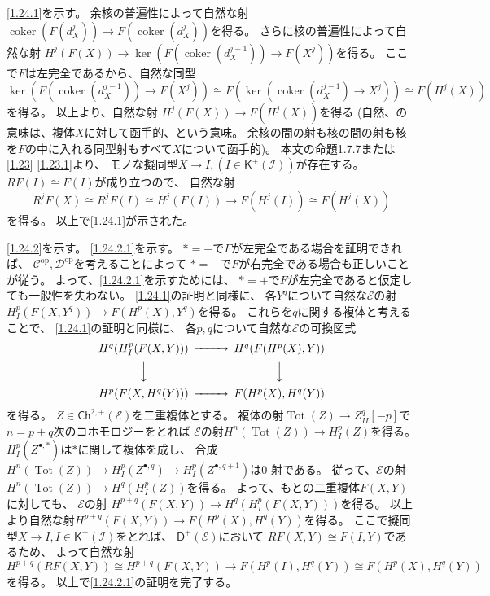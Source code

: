 \documentclass[uplatex,dvipdfmx]{jsarticle}
\makeatletter
\theoremstyle{definition}
\renewenvironment{proof}[1][\proofname]{
  \pushQED{\qed}%
  \normalfont \topsep6\p@\@plus6\p@\relax
  \trivlist
  \item[\hskip\labelsep
    #1\@addpunct{\textbf{.}}]\ignorespaces
}{%
  \popQED\endtrivlist\@endpefalse
}
\providecommand{\proofname}{証明}
\newcommand{\op}{\mathrm{op}}
\DeclareMathOperator{\Tot}{\mathrm{Tot}}
\DeclareMathOperator{\coker}{\mathrm{coker}}
\newcommand{\Ch}{\mathsf{Ch}}
\newcommand{\sfK}{\mathsf{K}}
\newcommand{\sfD}{\mathsf{D}}
\newcommand\mcC{\mathcal{C}}
\newcommand\mcD{\mathcal{D}}
\newcommand\mcE{\mathcal{E}}
\newcommand\mcI{\mathcal{I}}
\makeatother
\begin{document}
\begin{proof}
  \ref{1.24.1}を示す。
  余核の普遍性によって自然な射\(\coker(F(d_X^j)) \to F(\coker(d_X^j))\)を得る。
  さらに核の普遍性によって自然な射
  \(H^j(F(X)) \to \ker(F(\coker(d_X^{j-1}))\to F(X^j))\)を得る。
  ここで\(F\)は左完全であるから、自然な同型
  \(\ker(F(\coker(d_X^{j-1}))\to F(X^j)) \cong
  F(\ker(\coker(d_X^{j-1})\to X^j)) \cong F(H^j(X))\)を得る。
  以上より、自然な射
  \(H^j(F(X)) \to F(H^j(X))\)を得る
  (自然、の意味は、複体\(X\)に対して函手的、という意味。
  余核の間の射も核の間の射も核を\(F\)の中に入れる同型射もすべて\(X\)について函手的)。
  本文の命題1.7.7または\autoref{1.23} \ref{1.23.1}より、
  モノな擬同型\(X\to I, (I\in \sfK^+(\mcI))\)が存在する。
  \(RF(I)\cong F(I)\)が成り立つので、
  自然な射
  \[R^jF(X) \cong R^jF(I) \cong H^j(F(I)) \to F(H^j(I)) \cong F(H^j(X))\]
  を得る。
  以上で\ref{1.24.1}が示された。

  \ref{1.24.2}を示す。
  \ref{1.24.2.1}を示す。
  \(*=+\)で\(F\)が左完全である場合を証明できれば、
  \(\mcC^{\op},\mcD^{\op}\)を考えることによって
  \(*=-\)で\(F\)が右完全である場合も正しいことが従う。
  よって、\ref{1.24.2.1}を示すためには、
  \(*=+\)で\(F\)が左完全であると仮定しても一般性を失わない。
  \ref{1.24.1}の証明と同様に、
  各\(Y^q\)について自然な\(\mcE\)の射
  \(H_I^p(F(X,Y^q)) \to F(H^p(X),Y^q)\)を得る。
  これらを\(q\)に関する複体と考えることで、
  \ref{1.24.1}の証明と同様に、
  各\(p,q\)について自然な\(\mcE\)の可換図式
  \[
  \begin{CD}
    H^q(H_I^p(F(X,Y))) @>>> H^q(F(H^p(X),Y)) \\
    @VVV @VVV \\
    H^p(F(X,H^q(Y))) @>>> F(H^p(X),H^q(Y))
  \end{CD}
  \]
  を得る。
  \(Z\in \Ch^{2,+}(\mcE)\)を二重複体とする。
  複体の射\(\Tot(Z) \to Z^q_{II}[-p]\)で\(n=p+q\)次のコホモロジーをとれば
  \(\mcE\)の射\(H^n(\Tot(Z)) \to H_I^p(Z)\)を得る。
  \(H_I^p(Z^{\bullet,*})\)は\(*\)に関して複体を成し、
  合成\(H^n(\Tot(Z)) \to H_I^p(Z^{\bullet,q})\to H_I^p(Z^{\bullet,q+1})\)は\(0\)-射である。
  従って、\(\mcE\)の射\(H^n(\Tot(Z)) \to H^q(H_I^p(Z))\)を得る。
  よって、もとの二重複体\(F(X,Y)\)に対しても、
  \(\mcE\)の射
  \(H^{p+q}(F(X,Y)) \to H^q(H_I^p(F(X,Y)))\)を得る。
  以上より自然な射\(H^{p+q}(F(X,Y))\to F(H^p(X),H^q(Y))\)を得る。
  ここで擬同型\(X\to I,I\in\sfK^+(\mcI)\)をとれば、
  \(\sfD^+(\mcE)\)において
  \(RF(X,Y)\cong F(I,Y)\)であるため、
  よって自然な射
  \[H^{p+q}(RF(X,Y)) \cong H^{p+q}(F(X,Y)) \to F(H^p(I),H^q(Y)) \cong F(H^p(X),H^q(Y))\]
  を得る。
  以上で\ref{1.24.2.1}の証明を完了する。


\end{proof}
\end{document}
